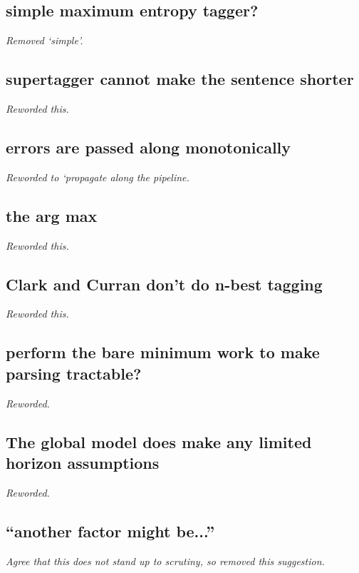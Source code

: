 \subsection{simple maximum entropy tagger?}

\emph{Removed `simple'.}

\subsection{supertagger cannot make the sentence shorter}

\emph{Reworded this.}

\subsection{errors are passed along monotonically}

\emph{Reworded to `propagate along the pipeline.}

\subsection{the arg max}

\emph{Reworded this.}

\subsection{Clark and Curran don't do n-best tagging}

\emph{Reworded this.}

\subsection{perform the bare minimum work to make parsing tractable?}

\emph{Reworded.}

\subsection{The global model does make any limited horizon assumptions}

\emph{Reworded.}

\subsection{``another factor might be...''}

\emph{Agree that this does not stand up to scrutiny, so removed this suggestion.}

